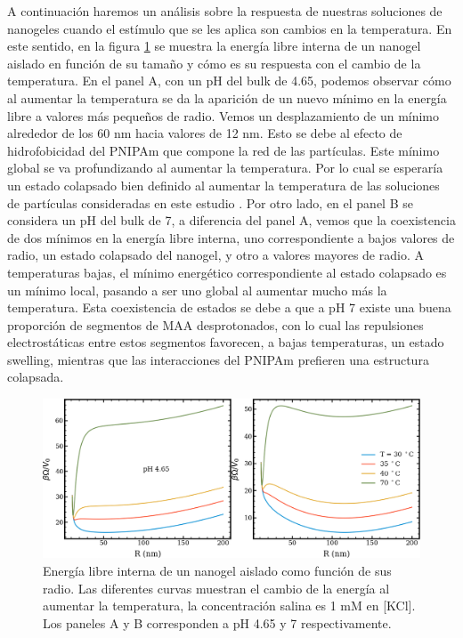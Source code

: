 	A continuaci\'on haremos un an\'alisis sobre la respuesta de nuestras soluciones de nanogeles cuando el est\'imulo que se les aplica son cambios en la temperatura. En este sentido, en la figura \ref{fig:mc:dfs_energy} se muestra la energ\'ia libre interna de un nanogel aislado en funci\'on de su tama\~no y c\'omo es su respuesta con el cambio de la temperatura. En el panel A, con un pH del bulk de 4.65, podemos observar c\'omo al aumentar la temperatura se da la aparici\'on de un nuevo m\'inimo en la energ\'ia libre a valores m\'as peque\~nos de radio. Vemos un desplazamiento de un m\'inimo alrededor de los 60 nm hacia valores de 12 nm. Esto se debe al efecto de hidrofobicidad del PNIPAm que compone la red de las part\'iculas. Este m\'inimo global se va profundizando al aumentar la temperatura. Por lo cual se esperar\'ia un estado colapsado bien definido al aumentar la temperatura de las soluciones de part\'iculas consideradas en este estudio . Por otro lado, en el panel B se considera un pH del bulk de 7, a diferencia del panel A, vemos que la coexistencia de dos m\'inimos en la energ\'ia libre interna, uno correspondiente a bajos valores de radio, un estado colapsado del nanogel, y otro a valores mayores de radio. A temperaturas bajas, el m\'inimo energ\'etico correspondiente al estado colapsado es un m\'inimo local, pasando a ser uno global al aumentar mucho m\'as la temperatura. Esta coexistencia de estados se debe a que a pH 7 existe una buena proporci\'on de segmentos de MAA desprotonados, con lo cual las repulsiones electrost\'aticas entre estos segmentos favorecen, a bajas temperaturas, un estado swelling, mientras que las interacciones del PNIPAm prefieren una estructura colapsada.%

	
	
	\begin{figure}[!htb]
		\centering
		\includegraphics[width=0.65\linewidth]{Figures/graph-mc/aa.png}
		\caption{Energ\'ia libre interna de un nanogel aislado como funci\'on de sus radio. Las diferentes curvas muestran el cambio de la energ\'ia al aumentar la temperatura, la concentraci\'on salina es 1 mM en [KCl]. Los paneles A y B corresponden a pH 4.65 y 7 respectivamente.}
		\label{fig:mc:dfs_energy}
	\end{figure}

